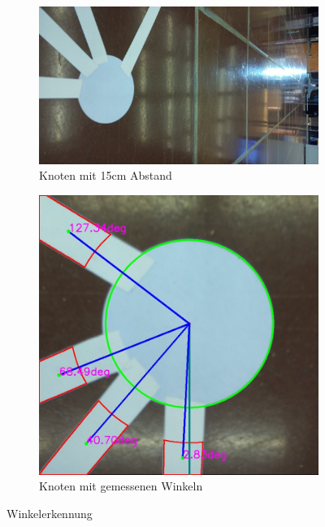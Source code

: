\begin{figure}[H]
\begin{subfigure}{0.55\textwidth}
\includegraphics[width=0.95\linewidth]{assets/informatik-prototyp/opencv/knoten-bild.jpeg} 
\caption{Knoten mit 15cm Abstand}
\label{fig:node-15cm-before}
\end{subfigure}
\begin{subfigure}{0.4\textwidth}
\includegraphics[width=0.95\linewidth]{assets/informatik-prototyp/opencv/knoten-winkel.jpeg} 
\caption{Knoten mit gemessenen Winkeln}
\label{fig:node-angles}
\end{subfigure}

\caption{Winkelerkennung}
\label{fig:angle-recognition}
\end{figure}

